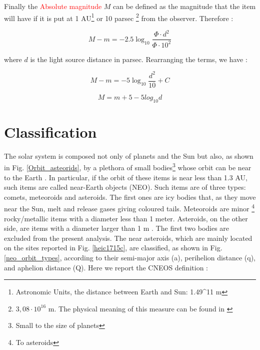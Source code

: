 \documentclass[12pt,%
               a4paper,%
               oneside,openany,%
               titlepage,%
               headinclude,footinclude,%
               BCOR5mm,%
               cleardoublepage=empty,%
               tablecaptionabove,%
               floatperchapter,
               ]{scrreprt}                 %
\begin{document}
Finally the \textcolor{red}{Absolute magnitude} $M$ can be defined as the magnitude that the item will have if it is put at 1 AU\footnote{Astronomic Units, the distance between Earth and Sun: 1.49^{11} m} or 10 parsec \footnote{$3,08\cdot 10^{16}$ m. The physical meaning of this measure can be found in \cite{burbine2016asteroids}} from the observer. Therefore  \cite{burbine2016asteroids}:

\begin{equation}
M-m=-2.5\log_{10}\frac{\Phi\cdot d^{2} }{\Phi\cdot 10^{2}}
\end{equation}

where $d$ is the light source distance in parsec. Rearranging the terms, we have \cite{burbine2016asteroids}:

\begin{equation}
M-m=-5\log_{10}\frac{ d^{2} }{10}+C
\end{equation}

\begin{equation}
M=m+5-5log_{10}d
\end{equation}



\section{Classification}

The solar system is composed not only of planets and the Sun but also, as shown in Fig. \ref{Orbit_asteorids}, by a plethora of small bodies\footnote{Small to the size of planets} whose orbit can be near to the Earth \cite{burbine2016asteroids}. In particular, if the orbit of these items is near less than 1.3 AU, such items are called near-Earth objects (NEO). Such items are of three types: comets, meteoroids and asteroids. The first ones are icy bodies that, as they move near the Sun, melt and release gases giving coloured tails. Meteoroids are minor \footnote{To asteroids} rocky/metallic items with a diameter less than 1 meter. Asteroids, on the other side, are items with a diameter larger than 1 m \cite{burbine2016asteroids}. The first two bodies are excluded from the present analysis. The near asteroids, which are mainly located on the sites reported in Fig. \ref{heic1715c}, are classified, as shown in Fig. \ref{neo_orbit_types}, according to their semi-major axis (a), perihelion distance (q), and aphelion distance (Q). Here we report the CNEOS definition \cite{nasa_classification}:
\end{document}
